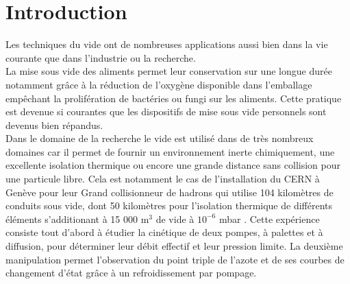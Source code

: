 \section{Introduction}


Les techniques du vide ont de nombreuses applications aussi bien dans la vie courante que dans l'industrie ou la recherche. \\
La mise sous vide des aliments permet leur conservation sur une longue durée notamment grâce à la réduction de l'oxygène disponible dans l'emballage empêchant la prolifération de bactéries ou fungi sur les aliments. Cette pratique est devenue si courantes que les dispositifs de mise sous vide personnels sont devenus bien répandus. \\
Dans le domaine de la recherche le vide est utilisé dans de très nombreux domaines car il permet de fournir un environnement inerte chimiquement, une excellente isolation thermique ou encore une grande distance sans collision pour une particule libre. Cela est notamment le cas de l'installation du CERN à Genève pour leur Grand collisionneur de hadrons qui utilise 104 kilomètres de conduits sous vide, dont 50 kilomètres pour l'isolation thermique de différents éléments s'additionant à 15 000 m\(^{3}\) de vide à \(10^{-6}\) mbar \cite{CERN}.
Cette expérience consiste tout d'abord à étudier la cinétique de deux pompes, à palettes et à diffusion, pour déterminer leur débit effectif et leur pression limite. La deuxième manipulation permet l'observation du point triple de l'azote et de ses courbes de changement d'état grâce à un refroidissement par pompage.

